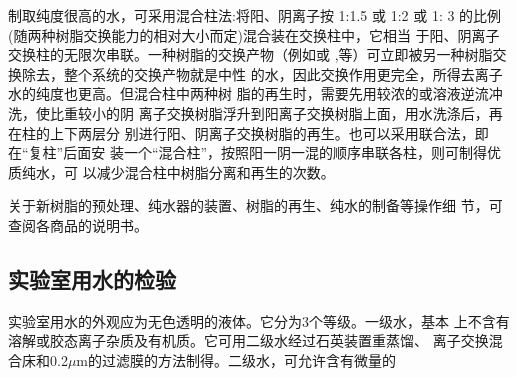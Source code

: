 制取纯度很高的水，可采用混合柱法:将阳、阴离子按 1:1.5 或 1:2 或 1:
3 的比例(随两种树脂交换能力的相对大小而定)混合装在交换柱中，它相当
于阳、阴离子交换柱的无限次串联。一种树脂的交换产物（例如或
,等）可立即被另一种树脂交换除去，整个系统的交换产物就是中性
的水，因此交换作用更完全，所得去离子水的纯度也更高。但混合柱中两种树
脂的再生时，需要先用较浓的或溶液逆流冲洗，使比重较小的阴
离子交换树脂浮升到阳离子交换树脂上面，用水洗涤后，再在柱的上下两层分
别进行阳、阴离子交换树脂的再生。也可以采用联合法，即在“复柱”后面安
装一个“混合柱”，按照阳一阴一混的顺序串联各柱，则可制得优质纯水，可
以减少混合柱中树脂分离和再生的次数。

关于新树脂的预处理、纯水器的装置、树脂的再生、纯水的制备等操作细
节，可查阅各商品的说明书。

\subsection{实验室用水的检验}

实验室用水的外观应为无色透明的液体。它分为3个等级。一级水，基本
上不含有溶解或胶态离子杂质及有机质。它可用二级水经过石英装置重蒸馏、
离子交换混合床和0.2$\mu$m的过滤膜的方法制得。二级水，可允许含有微量的